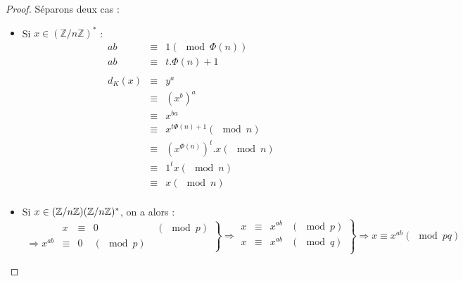 \documentclass[a4paper, 10pt]{thesis}
\begin{document}
\begin{proof}
    Séparons deux cas :
    \begin{itemize}
        \item Si $x \in (\mathbb{Z}/n\mathbb{Z})^*$ :
            \begin{displaymath}
                \begin{array}{rcl}
                    ab & \equiv & 1 (\mod \Phi(n)) \\
                    ab & \equiv & t.\Phi(n) + 1 \\
                    \\
                    d_K(x) & \equiv & y^a \\
                           & \equiv & (x^b)^a \\
                           & \equiv & x^{ba} \\
                           & \equiv & x^{t\Phi(n) + 1} (\mod n) \\
                           & \equiv & (x^{\Phi(n)})^t . x (\mod n) \\
                           & \equiv & 1^t x (\mod n) \\
                           & \equiv & x (\mod n)\\
                \end{array}
            \end{displaymath}
        \item Si $x \in (\mathbb{Z}/n\mathbb{Z}) \\ (\mathbb{Z}/n\mathbb{Z})^*$, on a alors : 
            \begin{displaymath}
                \left .
                \begin{array}{rrcll}
                    & x & \equiv & 0 & (\mod p) \\
                    \Rightarrow x^{ab} & \equiv & 0 & (\mod p) \
                \end{array}
                \right \rbrace \Rightarrow
                \left .
                \begin{array}{rcll}
                    x & \equiv & x^{ab} & (\mod p) \\
                    x & \equiv & x^{ab} & (\mod q) \\
                \end{array}
                \right \rbrace
                \Rightarrow x \equiv x^{ab} (\mod pq)
            \end{displaymath}
    \end{itemize}
\end{proof}
\end{document}

